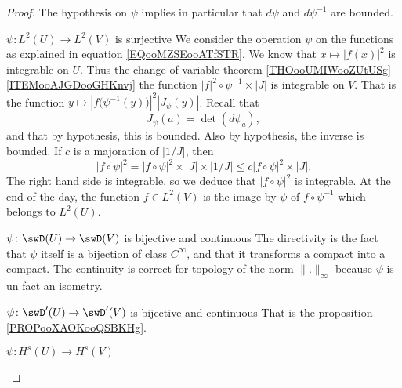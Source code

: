\begin{proof}
    The hypothesis on \( \psi\) implies in particular that \( d\psi\) and \( d\psi^{-1}\) are bounded.
    \begin{subproof}
    \item[\( \psi\colon L^2(U)\to L^2(V)\) is surjective] 
        We consider the operation \( \psi\) on the functions as explained in equation \eqref{EQooMZSEooATfSTR}. We know that \( x\mapsto | f(x) |^2\) is integrable on \( U\). Thus the change of variable theorem \ref{THOooUMIWooZUtUSg}\ref{ITEMooAJGDooGHKnvj} the function \( | f |^2\circ\psi^{-1}\times | J |\) is integrable on \( V\). That is the function \( y\mapsto | f\big( \psi^{-1}(y) \big) |^2| J_{\psi}(y) |\). Recall that
        \begin{equation}
            J_{\psi}(a)=\det(d\psi_a),
        \end{equation}
        and that by hypothesis, this is bounded. Also by hypothesis, the inverse is bounded. If \( c\) is a majoration of \( | 1/J |\), then
        \begin{equation}
            | f\circ\psi |^2=| f\circ\psi |^2\times | J |\times | 1/J |\leq c| f\circ\psi |^2\times | J |.
        \end{equation}
        The right hand side is integrable, so we deduce that \( | f\circ\psi |^2\) is integrable. At the end of the day, the function \( f\in L^2(V)\) is the image by \( \psi\) of \( f\circ\psi^{-1}\) which belongs to \( L^2(U)\).

    \item[\( \psi\colon \swD(U)\to \swD(V)\) is bijective and continuous]
        The directivity is the fact that \( \psi\) itself is a bijection of class \(  C^{\infty}\), and that it transforms a compact into a compact. The continuity is correct for topology of the norm \( \| . \|_{\infty}\) because \( \psi\) is un fact an isometry.

    \item[\( \psi\colon \swD'(U)\to \swD'(V)\) is bijective and continuous]
        That is the proposition \ref{PROPooXAOKooQSBKHg}.

    \item[\( \psi\colon H^s(U)\to H^s(V)\)]
        

\end{subproof}
\end{proof}
